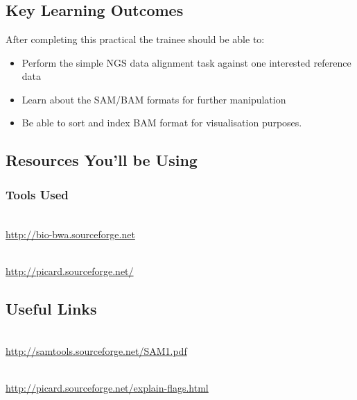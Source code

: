 
\chapter{\moduleTitle}
\newpage

\section{Key Learning Outcomes}

After completing this practical the trainee should be able to:
\begin{itemize}
  \item Perform the simple NGS data alignment task against one interested reference data
  \item Learn about the SAM/BAM formats for further manipulation 
  \item Be able to sort and index BAM format for visualisation purposes.
\end{itemize}

\section{Resources You'll be Using}
 
\subsection{Tools Used}
\begin{description}[style=multiline,labelindent=0cm,align=left,leftmargin=0.5cm]
  \item[BWA Burrow Wheel Algorithm]\hfill\\
  	\url{http://bio-bwa.sourceforge.net}
  \item[Samtools]\hfill\\
  	\url{http://picard.sourceforge.net/}
\end{description}

\section{Useful Links}
 
\begin{description}[style=multiline,labelindent=0cm,align=left,leftmargin=0.5cm]
  \item[SAM Specification]\hfill\\
    \url{http://samtools.sourceforge.net/SAM1.pdf}
  \item[Explain SAM Flags]\hfill\\
    \url{http://picard.sourceforge.net/explain-flags.html}
\end{description}

